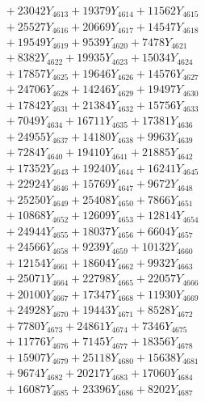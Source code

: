 \documentclass[a4paper,10pt]{article}
\begin{document}
{\begin{align}
&\;  + 23042 Y_{4613} + 19379 Y_{4614} + 11562 Y_{4615} \\[0.3ex]
&\;  + 25527 Y_{4616} + 20669 Y_{4617} + 14547 Y_{4618} \\[0.5ex]\allowbreak
&\;  + 19549 Y_{4619} + 9539 Y_{4620} + 7478 Y_{4621} \\[0.3ex]
&\;  + 8382 Y_{4622} + 19935 Y_{4623} + 15034 Y_{4624} \\[0.3ex]
&\;  + 17857 Y_{4625} + 19646 Y_{4626} + 14576 Y_{4627} \\[0.3ex]
&\;  + 24706 Y_{4628} + 14246 Y_{4629} + 19497 Y_{4630} \\[0.3ex]
&\;  + 17842 Y_{4631} + 21384 Y_{4632} + 15756 Y_{4633} \\[0.3ex]
&\;  + 7049 Y_{4634} + 16711 Y_{4635} + 17381 Y_{4636} \\[0.3ex]
&\;  + 24955 Y_{4637} + 14180 Y_{4638} + 9963 Y_{4639} \\[0.3ex]
&\;  + 7284 Y_{4640} + 19410 Y_{4641} + 21885 Y_{4642} \\[0.3ex]
&\;  + 17352 Y_{4643} + 19240 Y_{4644} + 16241 Y_{4645} \\[0.3ex]
&\;  + 22924 Y_{4646} + 15769 Y_{4647} + 9672 Y_{4648} \\[0.5ex]\allowbreak
&\;  + 25250 Y_{4649} + 25408 Y_{4650} + 7866 Y_{4651} \\[0.3ex]
&\;  + 10868 Y_{4652} + 12609 Y_{4653} + 12814 Y_{4654} \\[0.3ex]
&\;  + 24944 Y_{4655} + 18037 Y_{4656} + 6604 Y_{4657} \\[0.3ex]
&\;  + 24566 Y_{4658} + 9239 Y_{4659} + 10132 Y_{4660} \\[0.3ex]
&\;  + 12154 Y_{4661} + 18604 Y_{4662} + 9932 Y_{4663} \\[0.3ex]
&\;  + 25071 Y_{4664} + 22798 Y_{4665} + 22057 Y_{4666} \\[0.3ex]
&\;  + 20100 Y_{4667} + 17347 Y_{4668} + 11930 Y_{4669} \\[0.3ex]
&\;  + 24928 Y_{4670} + 19443 Y_{4671} + 8528 Y_{4672} \\[0.3ex]
&\;  + 7780 Y_{4673} + 24861 Y_{4674} + 7346 Y_{4675} \\[0.3ex]
&\;  + 11776 Y_{4676} + 7145 Y_{4677} + 18356 Y_{4678} \\[0.5ex]\allowbreak
&\;  + 15907 Y_{4679} + 25118 Y_{4680} + 15638 Y_{4681} \\[0.3ex]
&\;  + 9674 Y_{4682} + 20217 Y_{4683} + 17060 Y_{4684} \\[0.3ex]
&\;  + 16087 Y_{4685} + 23396 Y_{4686} + 8202 Y_{4687} \\[0.3ex]

\end{align}}
\end{document}
